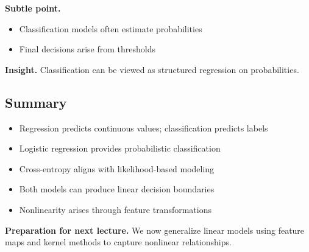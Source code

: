 \medskip

\noindent
\textbf{Subtle point.}
\begin{itemize}
    \item Classification models often estimate probabilities
    \item Final decisions arise from thresholds
\end{itemize}

\medskip

\noindent
\textbf{Insight.}  
Classification can be viewed as structured regression on probabilities.

\subsection{Summary}

\begin{itemize}
    \item Regression predicts continuous values; classification predicts labels
    \item Logistic regression provides probabilistic classification
    \item Cross-entropy aligns with likelihood-based modeling
    \item Both models can produce linear decision boundaries
    \item Nonlinearity arises through feature transformations
\end{itemize}

\medskip

\noindent
\textbf{Preparation for next lecture.}  
We now generalize linear models using feature maps and kernel methods to capture nonlinear relationships.